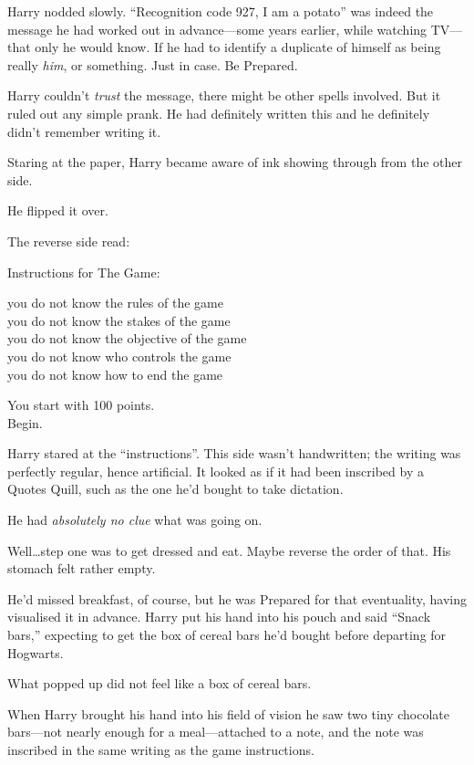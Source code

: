 Harry nodded slowly. “Recognition code 927, I am a potato” was indeed the message he had worked out in advance—some years earlier, while watching TV—that only he would know. If he had to identify a duplicate of himself as being really \emph{him}, or something. Just in case. Be Prepared.

Harry couldn’t \emph{trust} the message, there might be other spells involved. But it ruled out any simple prank. He had definitely written this and he definitely didn’t remember writing it.

Staring at the paper, Harry became aware of ink showing through from the other side.

He flipped it over.

The reverse side read:

\begin{writtenNote}
Instructions for The Game:

you do not know the rules of the game\\
you do not know the stakes of the game\\
you do not know the objective of the game\\
you do not know who controls the game\\
you do not know how to end the game

You start with 100 points.\\
Begin.
\end{writtenNote}

Harry stared at the “instructions”. This side wasn’t handwritten; the writing was perfectly regular, hence artificial. It looked as if it had been inscribed by a Quotes Quill, such as the one he’d bought to take dictation.

He had \emph{absolutely no clue} what was going on.

Well…step one was to get dressed and eat. Maybe reverse the order of that. His stomach felt rather empty.

He’d missed breakfast, of course, but he was Prepared for that eventuality, having visualised it in advance. Harry put his hand into his pouch and said “Snack bars,” expecting to get the box of cereal bars he’d bought before departing for Hogwarts.

What popped up did not feel like a box of cereal bars.

When Harry brought his hand into his field of vision he saw two tiny chocolate bars—not nearly enough for a meal—attached to a note, and the note was inscribed in the same writing as the game instructions.

